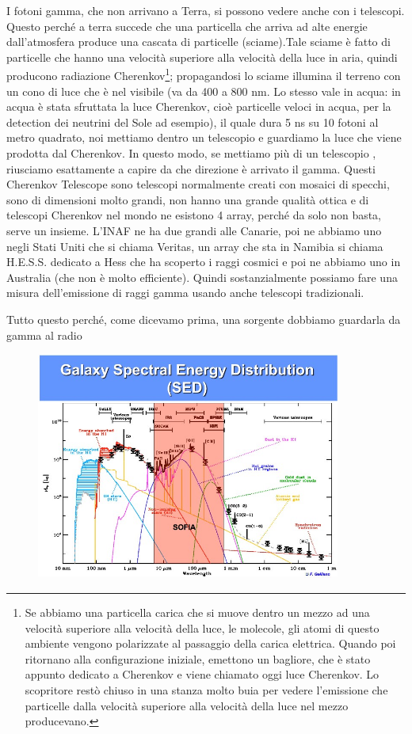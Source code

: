 I fotoni gamma, che non arrivano a Terra, si possono vedere anche con i telescopi. Questo perché a terra succede che una particella che arriva ad alte energie dall'atmosfera produce una cascata di particelle (sciame).Tale sciame è fatto di particelle che hanno una velocità superiore alla velocità della luce in aria, quindi producono radiazione Cherenkov\footnote{Se abbiamo una particella carica che si muove dentro un mezzo ad una velocità superiore alla velocità della luce, le molecole, gli atomi di questo ambiente vengono polarizzate al passaggio della carica elettrica. Quando poi ritornano alla configurazione iniziale, emettono un bagliore, che è stato appunto dedicato a Cherenkov e viene chiamato oggi luce Cherenkov. Lo scopritore restò chiuso in una stanza molto buia per vedere l'emissione che particelle dalla velocità superiore alla velocità della luce nel mezzo producevano.}; propagandosi lo sciame illumina il terreno con un cono di luce che è nel visibile (va da 400 a 800 nm. Lo stesso vale in acqua: in acqua è stata sfruttata la luce Cherenkov, cioè particelle veloci in acqua, per la detection dei neutrini del Sole ad esempio), il quale dura 5 ns su 10 fotoni al metro quadrato, noi mettiamo dentro un telescopio e guardiamo la luce che viene prodotta dal Cherenkov. In questo modo, se mettiamo più di un telescopio , riusciamo esattamente a capire da che direzione è arrivato il gamma. Questi Cherenkov Telescope sono telescopi normalmente creati con mosaici di specchi, sono di dimensioni molto grandi, non hanno una grande qualità ottica e di telescopi Cherenkov nel mondo ne esistono 4 array, perché da solo non basta, serve un insieme.
L'INAF ne ha due grandi alle Canarie, poi ne abbiamo uno negli Stati Uniti che si chiama Veritas, un array che sta in Namibia si chiama H.E.S.S. dedicato a Hess che ha scoperto i raggi cosmici e poi ne abbiamo uno in Australia (che non è molto efficiente). Quindi sostanzialmente possiamo fare una misura dell'emissione di raggi gamma usando anche telescopi tradizionali.

Tutto questo perché, come dicevamo prima, una sorgente dobbiamo guardarla da gamma al radio 

\begin{figure}[H]
    \centering
    \includegraphics[width=10cm]{39.jpg}
\end{figure}

